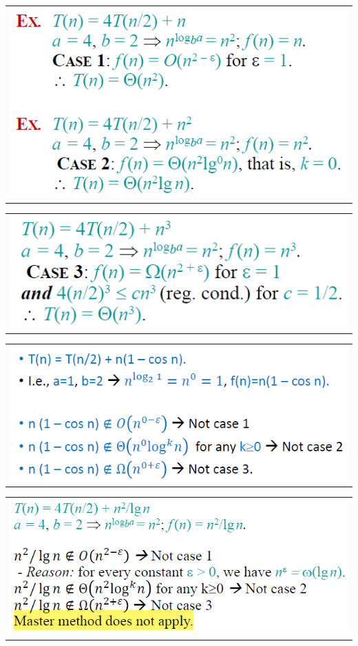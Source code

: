 \documentclass[10pt,landscape,a4paper]{article}
\begin{document}
\begin{multicols*}{4}
\begin{enumerate}
\begin{itemize}
		\end{itemize}
	\end{enumerate}
	\begin{tabular}{l}
		\includegraphics[width=0.45\linewidth]{master_theorem_1}
	\end{tabular}
	\begin{tabular}{l}
		\includegraphics[width=0.45\linewidth]{master_theorem_2}
	\end{tabular}
	\begin{tabular}{l}
		\includegraphics[width=0.45\linewidth]{wrong_master_theorem_1}
	\end{tabular}
	\begin{tabular}{l}
		\includegraphics[width=0.45\linewidth]{wrong_master_theorem_2}
	\end{tabular}

\end{multicols*}
\end{document}
